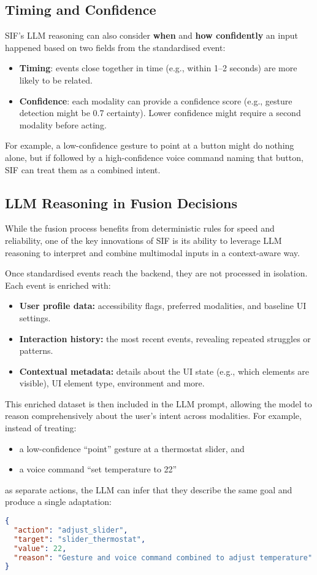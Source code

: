 \subsection{Timing and Confidence}
SIF's LLM reasoning can also consider \textbf{when} and \textbf{how confidently} an input happened based on two fields from the standardised event:
\begin{itemize}
    \item \textbf{Timing}: events close together in time (e.g., within 1–2 seconds) are more likely to be related.
    \item \textbf{Confidence}: each modality can provide a confidence score (e.g., gesture detection might be 0.7 certainty). Lower confidence might require a second modality before acting.
\end{itemize}
For example, a low-confidence gesture to point at a button might do nothing alone, but if followed by a high-confidence voice command naming that button, SIF can treat them as a combined intent.

\subsection{LLM Reasoning in Fusion Decisions}
While the fusion process benefits from deterministic rules for speed and reliability, one of the key innovations of SIF is its ability to leverage LLM reasoning to interpret and combine multimodal inputs in a context-aware way. 

Once standardised events reach the backend, they are not processed in isolation. Each event is enriched with:
\begin{itemize}
    \item \textbf{User profile data:} accessibility flags, preferred modalities, and baseline UI settings.
    \item \textbf{Interaction history:} the most recent events, revealing repeated struggles or patterns.
    \item \textbf{Contextual metadata:} details about the UI state (e.g., which elements are visible), UI element type, environment and more.
\end{itemize}

This enriched dataset is then included in the LLM prompt, allowing the model to reason comprehensively about the user’s intent across modalities.  
For example, instead of treating:
\begin{itemize}
    \item a low-confidence “point” gesture at a thermostat slider, and
    \item a voice command “set temperature to 22”
\end{itemize}
as separate actions, the LLM can infer that they describe the same goal and produce a single adaptation: 
\begin{lstlisting}[language=json]
{
  "action": "adjust_slider",
  "target": "slider_thermostat",
  "value": 22,
  "reason": "Gesture and voice command combined to adjust temperature"
}
\end{lstlisting}

